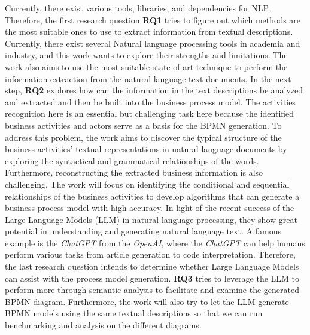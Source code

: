 	
	Currently, there exist various tools, libraries, and dependencies for NLP. Therefore, the first research question \textbf{RQ1} tries to figure out which methods are the most suitable ones to use to extract information from textual descriptions. Currently, there exist several Natural language processing tools in academia and industry, and this work wants to explore their strengths and limitations. The work also aims to use the most suitable state-of-art-technique to perform the information extraction from the natural language text documents. 
	In the next step, \textbf{RQ2} explores how can the information in the text descriptions be analyzed and extracted and then be built into the business process model. The activities recognition here is an essential but challenging task here because the identified business activities and actors serve as a basis for the BPMN generation. To address this problem, the work aims to discover the typical structure of the business activities' textual representations in natural language documents by exploring the syntactical and grammatical relationships of the words. Furthermore, reconstructing the extracted business information is also challenging. The work will focus on identifying the conditional and sequential relationships of the business activities to develop algorithms that can generate a business process model with high accuracy.
	In light of the recent success of the Large Language Models (LLM) in natural language processing, they show great potential in understanding and generating natural language text. A famous example is the \textit{ChatGPT} from the \textit{OpenAI}, where the \textit{ChatGPT} can help humans perform various tasks from article generation to code interpretation. Therefore, the last research question intends to determine whether Large Language Models can assist with the process model generation. \textbf{RQ3} tries to leverage the LLM to perform more through semantic analysis to facilitate and examine the generated BPMN diagram. Furthermore, the work will also try to let the LLM generate BPMN models using the same textual descriptions so that we can run benchmarking and analysis on the different diagrams.

	
	
	
	


